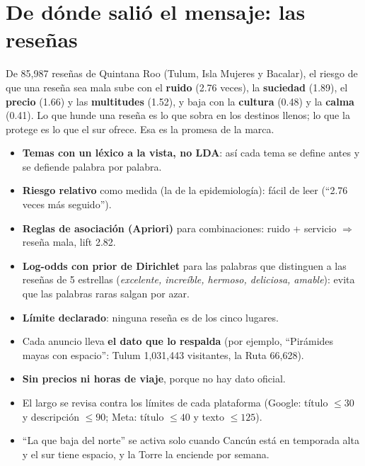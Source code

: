 \section*{De dónde salió el mensaje: las reseñas}
De 85,987 reseñas de Quintana Roo (Tulum, Isla Mujeres y Bacalar), el riesgo de que una reseña sea mala sube con el
\textbf{ruido} (2.76 veces), la \textbf{suciedad} (1.89), el \textbf{precio} (1.66) y las \textbf{multitudes} (1.52), y baja con
la \textbf{cultura} (0.48) y la \textbf{calma} (0.41). Lo que hunde una reseña es lo que sobra en los destinos llenos; lo que la
protege es lo que el sur ofrece. Esa es la promesa de la marca.

\begin{opciones}
\begin{itemize}
\item \textbf{Temas con un léxico a la vista, no LDA}: así cada tema se define antes y se defiende palabra por palabra.
\item \textbf{Riesgo relativo} como medida (la de la epidemiología): fácil de leer (``2.76 veces más seguido'').
\item \textbf{Reglas de asociación (Apriori)} para combinaciones: ruido + servicio $\Rightarrow$ reseña mala, lift 2.82.
\item \textbf{Log-odds con prior de Dirichlet} para las palabras que distinguen a las reseñas de 5 estrellas
  (\emph{excelente, increíble, hermoso, deliciosa, amable}): evita que las palabras raras salgan por azar.
\item \textbf{Límite declarado}: ninguna reseña es de los cinco lugares.
\end{itemize}
\end{opciones}

\begin{opciones}
\begin{itemize}
\item Cada anuncio lleva \textbf{el dato que lo respalda} (por ejemplo, ``Pirámides mayas con espacio'': Tulum 1,031,443
  visitantes, la Ruta 66,628).
\item \textbf{Sin precios ni horas de viaje}, porque no hay dato oficial.
\item El largo se revisa contra los límites de cada plataforma (Google: título $\le30$ y descripción $\le90$; Meta: título
  $\le40$ y texto $\le125$).
\item ``La que baja del norte'' se activa solo cuando Cancún está en temporada alta y el sur tiene espacio, y la Torre la
  enciende por semana.
\end{itemize}
\end{opciones}

